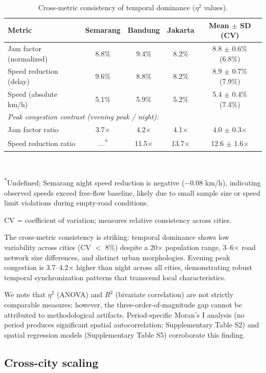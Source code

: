 \documentclass[preprint,12pt,authoryear]{elsarticle}
\begin{document}
\begin{table}[htbp]
\centering
\caption{Cross-metric consistency of temporal dominance ($\eta^2$ values).}
\label{tab:cross-metric}
\small
\begin{tabular}{lcccc}
\toprule
Metric & Semarang & Bandung & Jakarta & Mean $\pm$ SD (CV) \\
\midrule
Jam factor (normalized) & 8.8\% & 9.4\% & 8.2\% & 8.8 $\pm$ 0.6\% (6.8\%) \\
Speed reduction (delay) & 9.6\% & 8.8\% & 8.2\% & 8.9 $\pm$ 0.7\% (7.9\%) \\
Speed (absolute km/h) & 5.1\% & 5.9\% & 5.2\% & 5.4 $\pm$ 0.4\% (7.4\%) \\
\midrule
\multicolumn{5}{l}{\textit{Peak congestion contrast (evening peak / night):}} \\
\quad Jam factor ratio & 3.7$\times$ & 4.2$\times$ & 4.1$\times$ & 4.0 $\pm$ 0.3$\times$ \\
\quad Speed reduction ratio & ---\textsuperscript{*} & 11.5$\times$ & 13.7$\times$ & 12.6 $\pm$ 1.6$\times$ \\
\bottomrule
\end{tabular}
\\[0.5em]
{\footnotesize \textsuperscript{*}Undefined; Semarang night speed reduction is negative ($-$0.08 km/h), indicating observed speeds exceed free-flow baseline, likely due to small sample size or speed limit violations during empty-road conditions. \par CV = coefficient of variation; measures relative consistency across cities.}
\end{table}

The cross-metric consistency is striking: temporal dominance shows low variability across cities (CV $<$ 8\%) despite a 20$\times$ population range, 3--6$\times$ road network size differences, and distinct urban morphologies. Evening peak congestion is 3.7--4.2$\times$ higher than night across all cities, demonstrating robust temporal synchronization patterns that transcend local characteristics.

We note that $\eta^2$ (ANOVA) and $R^2$ (bivariate correlation) are not strictly comparable measures; however, the three-order-of-magnitude gap cannot be attributed to methodological artifacts. Period-specific Moran's I analysis (no period produces significant spatial autocorrelation; Supplementary Table S2) and spatial regression models (Supplementary Table S5) corroborate this finding.

\subsection{Cross-city scaling}
\end{document}
